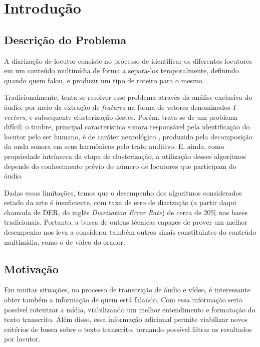 \chapter{Introdução}
\label{chap:intro}

\section{Descrição do Problema}
\label{sec:desc}

A diarização de locutor consiste no processo de identificar os diferentes locutores em um conteúdo multimídia de forma a separa-los temporalmente, definindo quando quem falou, e produzir um tipo de roteiro para o mesmo.

Tradicionalmente, tenta-se resolver esse problema através da análise exclusiva do áudio, por meio da extração de \textit{features} na forma de vetores denominados \textit{I-vectors}, e subsequente clusterização destes.
Porém, trata-se de um problema difícil; o timbre, principal característica sonora responsável pela identificação do locutor pelo ser humano, é de caráter neurológico \cite{oxenhamPitchPerception2012}, produzido pela decomposição da onda sonora em seus harmônicos pelo trato auditivo.
E, ainda, como propriedade intrínseca da etapa de clusterização, a utilização desses algoritmos depende do conhecimento prévio do número de locutores que participam do áudio.

Dadas essas limitações, temos que o desempenho dos algoritmos considerados estado da arte é insuficiente, com taxa de erro de diarização (a partir daqui chamada de DER, do inglês \textit{Diarization Error Rate}) de cerca de 20\% \cite{zewoudieUseLongtermFeatures2018} nas bases tradicionais.
Portanto, a busca de outras técnicas capazes de prover um melhor desempenho nos leva a considerar também outros sinais constituintes do conteúdo multimídia, como o de vídeo do orador.

\section{Motivação}
\label{sec:motiv}

Em muitas situações, no processo de transcrição de áudio e vídeo, é interessante obter também a informação de quem está falando.
Com essa informação seria possível roteirizar a mídia, viabilizando um melhor entendimento e formatação do texto transcrito.
Além disso, essa informação adicional permite viabilizar novos critérios de busca sobre o texto transcrito, tornando possível filtrar os resultados por locutor.

